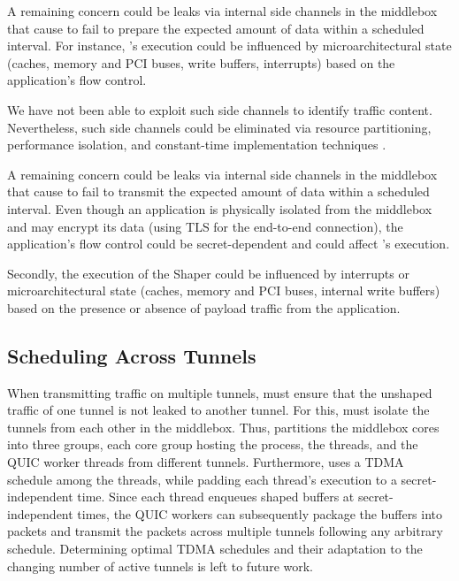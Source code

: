 A remaining concern could be leaks via internal side channels in the middlebox
that cause {\dshaper} to fail to prepare the expected amount of data within a
scheduled interval.
For instance, {\dshaper}'s execution could be influenced by microarchitectural
state (\eg caches, memory and PCI buses, write buffers, interrupts) based on the
application's flow control.

We have not been able to exploit such side channels to identify traffic content.
Nevertheless, such side channels could be eliminated via resource partitioning,
performance isolation, and constant-time implementation techniques
\cite{liu2016catalyst, coppens2009practical, zhang2011predinteractive,
    almeida2016verifying}.
\fi

A remaining concern could be leaks via internal side channels in the middlebox
that cause {\sys} to fail to transmit the expected amount of data within a
scheduled interval. Even though an application is physically isolated from the
middlebox and may encrypt its data (\eg using TLS for the end-to-end
connection), the application’s flow control could be secret-dependent and could
affect {\sys}'s execution.

 Secondly, the execution of the Shaper could be influenced by interrupts
or microarchitectural state (\eg caches, memory and PCI buses, internal write
buffers) based on the presence or absence of payload traffic from the
application.
\fi

\subsection{Scheduling Across Tunnels}
{When transmitting traffic on multiple tunnels, {\sys} must ensure that the
unshaped traffic of one tunnel is not leaked to another tunnel. For this, {\sys}
must isolate the tunnels from each other in the middlebox.
Thus, {\sys} partitions the middlebox cores into three groups, each core group
hosting the {\ushaper} process, the {\prepare} threads, and the QUIC worker
threads from different tunnels.
Furthermore, {\sys} uses a TDMA schedule among the {\prepare} threads, while
{padding} each thread's execution to a secret-independent time.
Since each {\prepare} thread enqueues shaped buffers at secret-independent
times, the QUIC workers can subsequently package the buffers into packets and
transmit the packets across multiple tunnels following any arbitrary schedule.}
%
{Determining optimal TDMA schedules and their adaptation to the changing
number of active tunnels is left to future work.}
\fi
